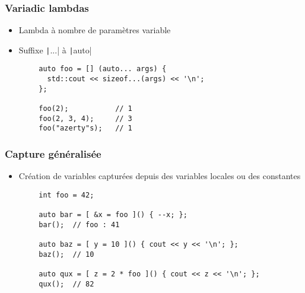 \documentclass[C++.tex]{subfiles}
\begin{document}
\begin{frame}[fragile]
	\frametitle{Variadic lambdas}
	\begin{itemize}
		\item Lambda à nombre de paramètres variable
		\item Suffixe \texttt|...| à \texttt|auto|
	\end{itemize}

	\begin{verbatim}
		auto foo = [] (auto... args) { 
		  std::cout << sizeof...(args) << '\n';
		};

		foo(2);           // 1
		foo(2, 3, 4);     // 3
		foo("azerty"s);   // 1
	\end{verbatim}

\end{frame}

\begin{frame}[fragile]
	\frametitle{Capture généralisée}
	\begin{itemize}
		\item Création de variables capturées depuis des variables locales ou des constantes
	\end{itemize}

	\begin{verbatim}
		int foo = 42;

		auto bar = [ &x = foo ]() { --x; };
		bar();  // foo : 41

		auto baz = [ y = 10 ]() { cout << y << '\n'; };
		baz();  // 10

		auto qux = [ z = 2 * foo ]() { cout << z << '\n'; };
		qux();  // 82
	\end{verbatim}

\end{frame}
\end{document}
